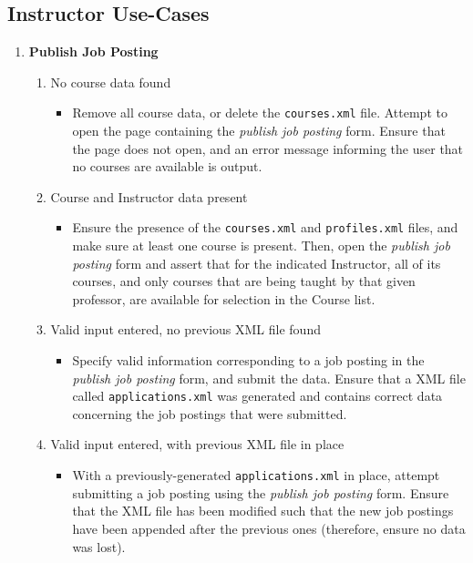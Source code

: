 \documentclass[12pt]{report}
\begin{document}
\subsection{Instructor Use-Cases}
\begin{enumerate}
	\item \textbf{Publish Job Posting}
		\begin{enumerate}
			\item No course data found
				\begin{itemize}
					\item Remove all course data, or delete the \texttt{courses.xml} file. Attempt
						to open the page containing the \textit{publish job posting} form. Ensure
						that the page does not open, and an error message informing the user that no
						courses are available is output.
				\end{itemize}
			\item Course and Instructor data present
				\begin{itemize}
					\item Ensure the presence of the \texttt{courses.xml} and \texttt{profiles.xml}
						files, and make sure at least one course is present. Then, open the
						\textit{publish job posting} form and assert that for the indicated
						Instructor, all of its courses, and only courses that are being taught by
						that given professor, are available for selection in the Course list.
				\end{itemize}
			\item Valid input entered, no previous XML file found
				\begin{itemize}
					\item Specify valid information corresponding to a job posting in the
						\textit{publish job posting} form, and submit the data. Ensure that a XML
						file called \texttt{applications.xml} was generated and contains correct
						data concerning the job postings that were submitted.
				\end{itemize}
			\item Valid input entered, with previous XML file in place
				\begin{itemize}
					\item With a previously-generated \texttt{applications.xml} in place, attempt
						submitting a job posting using the \textit{publish job posting} form. Ensure
						that the XML file has been modified such that the new job postings have been
						appended after the previous ones (therefore, ensure no data was lost).

\end{itemize}
\end{enumerate}
\end{enumerate}
\end{document}
